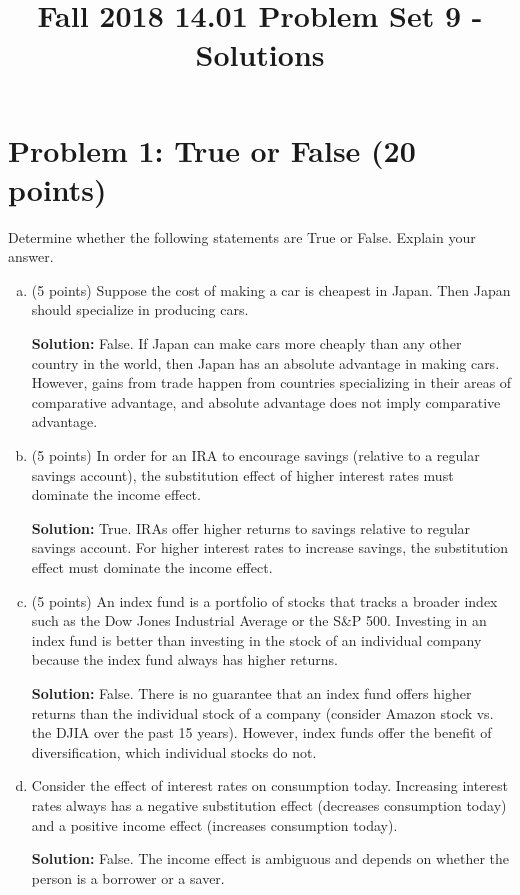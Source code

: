 \documentclass{article}
\title{Fall 2018 14.01 Problem Set 9 - Solutions}
\date{}
\begin{document}
\maketitle

\section*{Problem 1: True or False (20 points)}
Determine whether the following statements are True or False. Explain your answer.
\begin{enumerate}[(a)]
\item (5 points) Suppose the cost of making a car is cheapest in Japan. Then Japan should specialize in producing cars.

\textbf{Solution:} False. If Japan can make cars more cheaply than any other country in the world, then Japan has an absolute advantage in making cars. However, gains from trade happen from countries specializing in their areas of comparative advantage, and absolute advantage does not imply comparative advantage.

\item (5 points) In order for an IRA to encourage savings (relative to a regular savings account), the substitution effect of higher interest rates must dominate the income effect.

\textbf{Solution:} True. IRAs offer higher returns to savings relative to regular savings account. For higher interest rates to increase savings, the substitution effect must dominate the income effect.

\item (5 points) An index fund is a portfolio of stocks that tracks a broader index such as the Dow Jones Industrial Average or the S\&P 500. Investing in an index fund is better than investing in the stock of an individual company because the index fund always has higher returns.

\textbf{Solution:} False. There is no guarantee that an index fund offers higher returns than the individual stock of a company (consider Amazon stock vs. the DJIA over the past 15 years). However, index funds offer the benefit of diversification, which individual stocks do not.

\item Consider the effect of interest rates on consumption today. Increasing interest rates always has a negative substitution effect (decreases consumption today) and a positive income effect (increases consumption today).

\textbf{Solution:} False. The income effect is ambiguous and depends on whether the person is a borrower or a saver.

\end{enumerate}
\end{document}
